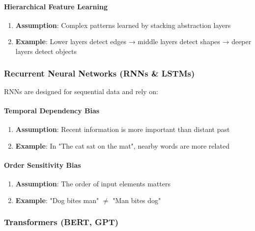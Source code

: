 \paragraph{Hierarchical Feature Learning}
\label{para:hierarchical-features}

\begin{enumerate}
\item \textbf{Assumption}: Complex patterns learned by stacking abstraction layers
\item \textbf{Example}: Lower layers detect edges → middle layers detect shapes → deeper layers detect objects
\end{enumerate}

\subsubsection{Recurrent Neural Networks (RNNs \& LSTMs)}
\label{subsubsec:rnn-inductive-bias}

RNNs are designed for sequential data and rely on:

\paragraph{Temporal Dependency Bias}
\label{para:temporal-dependency}

\begin{enumerate}
\item \textbf{Assumption}: Recent information is more important than distant past
\item \textbf{Example}: In "The cat sat on the mat", nearby words are more related
\end{enumerate}

\paragraph{Order Sensitivity Bias}
\label{para:order-sensitivity}

\begin{enumerate}
\item \textbf{Assumption}: The order of input elements matters
\item \textbf{Example}: "Dog bites man" $\neq$ "Man bites dog"
\end{enumerate}

\subsubsection{Transformers (BERT, GPT)}
\label{subsubsec:transformer-inductive-bias}

